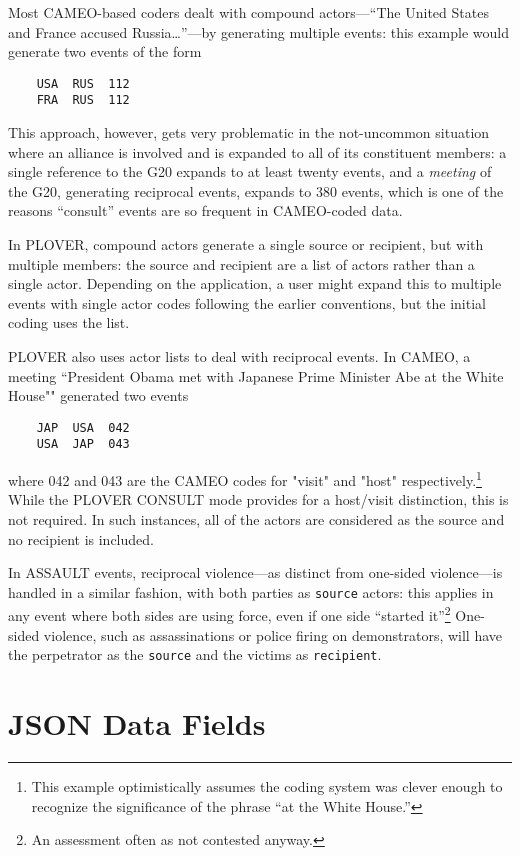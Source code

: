 \documentclass[11pt]{report}
\newcommand{\plcat}[1]{\textsf{#1}}
\begin{document}
Most CAMEO-based coders dealt with compound actors---``The United States and France accused Russia\ldots''---by generating multiple events: this example would generate two events of the form
\begin{verbatim}
	USA  RUS  112
	FRA  RUS  112
\end{verbatim}
This approach, however, gets very problematic in the not-uncommon situation where an alliance is involved and is expanded to all of its constituent members: a single reference to the G20 expands to at least twenty events, and a \textit{meeting} of the G20, generating reciprocal events, expands to 380 events, which is one of the reasons ``consult'' events are so frequent in CAMEO-coded data.

In PLOVER, compound actors generate a single source or recipient, but with multiple members: the source and recipient are a list of actors rather than a single actor. Depending on the application, a user might expand this to multiple events with single actor codes following the earlier conventions, but the initial coding uses the list.

PLOVER also uses actor lists to deal with reciprocal events. In CAMEO, a meeting ``President Obama met with Japanese Prime Minister Abe at the White House"" generated two events
\begin{verbatim}
	JAP  USA  042
	USA  JAP  043
\end{verbatim}
where 042 and 043 are the CAMEO codes for "visit" and "host" respectively.\footnote{This example optimistically assumes the coding system was clever enough to recognize the significance of the phrase ``at the White House.''} While the PLOVER \plcat{CONSULT} mode provides for a host/visit distinction, this is not required. In such instances, all of the actors are considered as the source and no recipient is included.

In \plcat{ASSAULT} events, reciprocal violence---as distinct from one-sided violence---is handled in a similar fashion, with both parties as \texttt{source} actors: this applies in any event where both sides are using force, even if one side ``started it''\footnote{An assessment often as not contested anyway.} One-sided violence, such as assassinations or police firing on demonstrators, will have the perpetrator as the \texttt{source} and the victims as \texttt{recipient}.

\chapter{JSON Data Fields}
\end{document}
